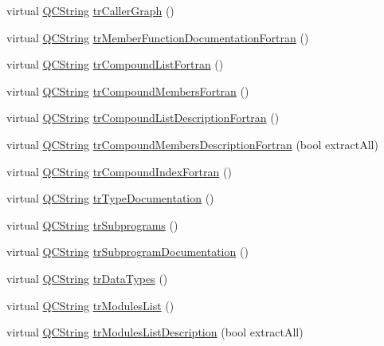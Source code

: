 \begin{DoxyCompactItemize}
virtual \mbox{\hyperlink{class_q_c_string}{Q\+C\+String}} \mbox{\hyperlink{class_translator_dutch_abff364dcd7a756f3de5cc12a6a55d76f}{tr\+Caller\+Graph}} ()
\item 
virtual \mbox{\hyperlink{class_q_c_string}{Q\+C\+String}} \mbox{\hyperlink{class_translator_dutch_a063a80a4af626566a7207db935895d63}{tr\+Member\+Function\+Documentation\+Fortran}} ()
\item 
virtual \mbox{\hyperlink{class_q_c_string}{Q\+C\+String}} \mbox{\hyperlink{class_translator_dutch_aecca430cdc52cd155a13f4de4119e035}{tr\+Compound\+List\+Fortran}} ()
\item 
virtual \mbox{\hyperlink{class_q_c_string}{Q\+C\+String}} \mbox{\hyperlink{class_translator_dutch_ac99a6e250f2ec58407017227412e4ba7}{tr\+Compound\+Members\+Fortran}} ()
\item 
virtual \mbox{\hyperlink{class_q_c_string}{Q\+C\+String}} \mbox{\hyperlink{class_translator_dutch_a99a96af0134d09dedff1c939595d5604}{tr\+Compound\+List\+Description\+Fortran}} ()
\item 
virtual \mbox{\hyperlink{class_q_c_string}{Q\+C\+String}} \mbox{\hyperlink{class_translator_dutch_a8e16864f137ab89c0a0d47264ab6eb7e}{tr\+Compound\+Members\+Description\+Fortran}} (bool extract\+All)
\item 
virtual \mbox{\hyperlink{class_q_c_string}{Q\+C\+String}} \mbox{\hyperlink{class_translator_dutch_a7218285d03e984a2fef5c9a69645a1a4}{tr\+Compound\+Index\+Fortran}} ()
\item 
virtual \mbox{\hyperlink{class_q_c_string}{Q\+C\+String}} \mbox{\hyperlink{class_translator_dutch_a1e69c129e9cab873cabc4ac90a708f61}{tr\+Type\+Documentation}} ()
\item 
virtual \mbox{\hyperlink{class_q_c_string}{Q\+C\+String}} \mbox{\hyperlink{class_translator_dutch_a980d765ac9d746331e68a9aec6cc9c66}{tr\+Subprograms}} ()
\item 
virtual \mbox{\hyperlink{class_q_c_string}{Q\+C\+String}} \mbox{\hyperlink{class_translator_dutch_a0a6b9d26f411dece9f54f6e7677e555e}{tr\+Subprogram\+Documentation}} ()
\item 
virtual \mbox{\hyperlink{class_q_c_string}{Q\+C\+String}} \mbox{\hyperlink{class_translator_dutch_a3a8bb02a7979cc69dfd836dcb744aa59}{tr\+Data\+Types}} ()
\item 
virtual \mbox{\hyperlink{class_q_c_string}{Q\+C\+String}} \mbox{\hyperlink{class_translator_dutch_a30552149aeec73208d6a205f8e77d223}{tr\+Modules\+List}} ()
\item 
virtual \mbox{\hyperlink{class_q_c_string}{Q\+C\+String}} \mbox{\hyperlink{class_translator_dutch_abe5b90add520d21b50eeecf3f3182933}{tr\+Modules\+List\+Description}} (bool extract\+All)

\end{DoxyCompactItemize}
